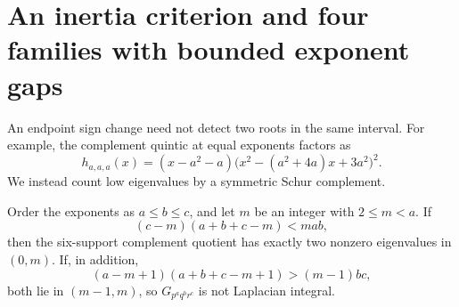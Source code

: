 \section{An inertia criterion and four families with bounded exponent gaps}
\label{sec:low-spectrum}

An endpoint sign change need not detect two roots in the same interval.
For example, the complement quintic at equal exponents factors as
\[
h_{a,a,a}(x)=(x-a^2-a)\bigl(x^2-(a^2+4a)x+3a^2\bigr)^2.
\]
We instead count low eigenvalues by a symmetric Schur complement.

\begin{proposition}
\label{prop:low-spectrum}
Order the exponents as $a\leq b\leq c$, and let $m$ be an integer
with $2\leq m<a$. If
\begin{equation}
\label{eq:upper-inertia}
(c-m)(a+b+c-m)<mab,
\end{equation}
then the six-support complement quotient has exactly two nonzero
eigenvalues in $(0,m)$. If, in addition,
\begin{equation}
\label{eq:lower-inertia}
(a-m+1)(a+b+c-m+1)>(m-1)bc,
\end{equation}
both lie in $(m-1,m)$, so $G_{p^a q^b r^c}$ is not Laplacian integral.
\end{proposition}

